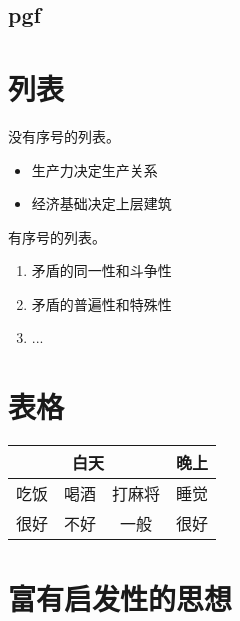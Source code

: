 \documentclass[openany,oneside]{book}
\theoremstyle{cthmstyle}
\theoremstyle{definition}
\theoremstyle{remark}
\begin{document}
\subsection{pgf}

\begin{center}
\end{center}

\newpage
\section{列表}

没有序号的列表。
\begin{itemize}
\item 生产力决定生产关系
\item 经济基础决定上层建筑
\end{itemize}

有序号的列表。
\begin{enumerate}
\item 矛盾的同一性和斗争性
\item 矛盾的普遍性和特殊性
\item ...
\end{enumerate}

\section{表格}

\begin{center}
        \begin{tabular}{|c|c|c|c|}
        \hline
        \multicolumn{3}{|c|}{白天} & 晚上 \\ \hline
        吃饭     & 喝酒     & 打麻将    & 睡觉 \\ \hline
        很好     & 不好     & 一般     & 很好 \\ \hline
        \end{tabular}
\end{center}

%
\clearpage
\section{富有启发性的思想}
\end{document}

